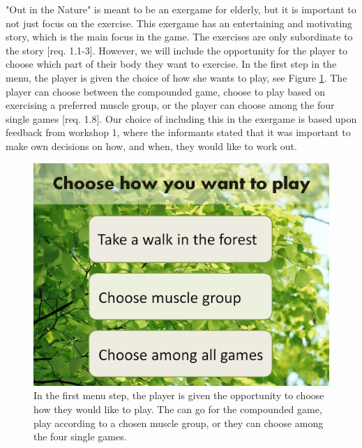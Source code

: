 "Out in the Nature" is meant to be an exergame for elderly, but it is important to not just focus on the exercise. This exergame has an entertaining and motivating story, which is the main focus in the game. The exercises are only subordinate to the story [req. 1.1-3]. However, we will include the opportunity for the player to choose which part of their body they want to exercise. In the first step in the menu, the player is given the choice of how she wants to play, see Figure \ref{fig:menuStart}. The player can choose between the compounded game, choose to play based on exercising a preferred muscle group, or the player can choose among the four single games [req. 1.8]. Our choice of including this in the exergame is based upon feedback from workshop 1, where the informants stated that it was important to make own decisions on how, and when, they would like to work out.                     

\begin{figure} [H]
\centering
\includegraphics[scale=0.24]{choosePlay.jpg}
\caption[The menu - start]{In the first menu step, the player is given the opportunity to choose how they would like to play. The can go for the compounded game, play according to a chosen muscle group, or they can choose among the four single games.}
\label{fig:menuStart}
\end{figure} 

